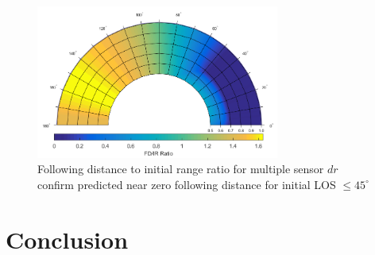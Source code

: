 \documentclass[conference]{IEEEtran}
\providecommand{\DIFdelbegin}{} %
\newcommand{\DIFscaledelfig}{0.5}
\newlength{\DIFdelgraphicswidth} %
\newlength{\DIFdelgraphicsheight} %
\newcommand{\DIFdelincludegraphics}[2][]{%
\sbox{\DIFdelgraphicsbox}{\DIFOincludegraphics[#1]{#2}}%
\settoboxwidth{\DIFdelgraphicswidth}{\DIFdelgraphicsbox} %
\settoboxtotalheight{\DIFdelgraphicsheight}{\DIFdelgraphicsbox} %
\scalebox{\DIFscaledelfig}{%
\parbox[b]{\DIFdelgraphicswidth}{\usebox{\DIFdelgraphicsbox}\\[-\baselineskip] \rule{\DIFdelgraphicswidth}{0em}}\llap{\resizebox{\DIFdelgraphicswidth}{\DIFdelgraphicsheight}{%
\setlength{\unitlength}{\DIFdelgraphicswidth}%
\begin{picture}(1,1)%
\thicklines\linethickness{2pt} %
{\color[rgb]{1,0,0}\put(0,0){\framebox(1,1){}}}%
{\color[rgb]{1,0,0}\put(0,0){\line( 1,1){1}}}%
{\color[rgb]{1,0,0}\put(0,1){\line(1,-1){1}}}%
\end{picture}%
}\hspace*{3pt}}} %
} %
\DeclareRobustCommand{\DIFdelbegin}{\DIFOdelbegin \let\includegraphics\DIFdelincludegraphics} %
\begin{document}
\begin{figure}[H]
	\centering
	\includegraphics[width=8cm]{correctpolar.png}
	\caption{Following distance to initial range ratio for multiple sensor $dr$ confirm predicted near zero following distance for initial LOS $\leq45^\circ$}
	\label{fig:Polar}
\end{figure}

\section{Conclusion}



\DIFdelbegin %


\end{document}
